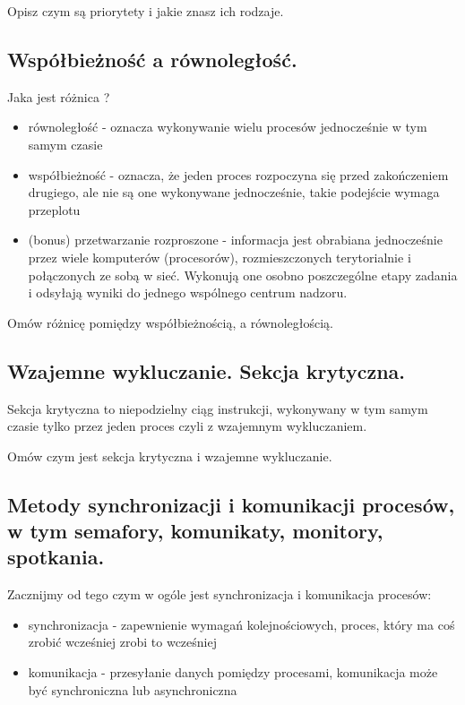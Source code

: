 \documentclass[a4paper,15pt]{article}
\newcommand{\ask}[2]{
    \begin{tcolorbox}[colback=black!5!white,colframe=gray,title={Pytanie #1}]
        #2
    \end{tcolorbox}
}
\begin{document}
\ask{}{
Opisz czym są priorytety i jakie znasz ich rodzaje. 
}


\subsection{Współbieżność a równoległość.}

Jaka jest różnica ? 
\begin{itemize}
\item równoległość - oznacza wykonywanie wielu procesów jednocześnie w tym samym czasie
\item współbieżność - oznacza, że jeden proces rozpoczyna się przed zakończeniem drugiego, ale nie są one wykonywane jednocześnie, takie podejście wymaga przeplotu
\item (bonus) przetwarzanie rozproszone -  informacja jest obrabiana jednocześnie przez wiele komputerów (procesorów), rozmieszczonych terytorialnie i połączonych ze sobą w sieć. Wykonują one osobno poszczególne etapy zadania i odsyłają wyniki do jednego wspólnego centrum nadzoru.
\end{itemize}

\ask{}{
Omów różnicę pomiędzy współbieżnością, a równoległością. 
}


\subsection{Wzajemne wykluczanie. Sekcja krytyczna.}

Sekcja krytyczna to niepodzielny ciąg instrukcji, wykonywany w tym samym czasie tylko przez jeden proces czyli z wzajemnym wykluczaniem.

\ask{}{
Omów czym jest sekcja krytyczna i wzajemne wykluczanie.
}


\subsection{Metody synchronizacji i komunikacji procesów, w tym semafory, komunikaty, monitory, spotkania.}

Zacznijmy od tego czym w ogóle jest synchronizacja i komunikacja procesów:
\begin{itemize}
\item synchronizacja - zapewnienie wymagań kolejnościowych, proces, który ma coś zrobić wcześniej zrobi to wcześniej 
\item komunikacja - przesyłanie danych pomiędzy procesami, komunikacja może być synchroniczna lub asynchroniczna
\end{itemize}
\end{document}
